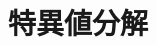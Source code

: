 \documentclass[../../topic_linear-algebra]{subfiles}
\begin{document}
\chapter{特異値分解}
\end{document}
